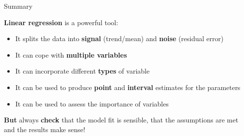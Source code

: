 \documentclass[pdf,handout]{beamer}
\begin{document}
\begin{frame}{Summary}

\textbf{Linear regression} is a powerful tool:

\begin{itemize}

\item It splits the data into \textbf{signal} (trend/mean) and \textbf{noise} (residual error)
\item It can cope with \textbf{multiple variables} 
\item It can incorporate different \textbf{types} of variable
\item It can be used to produce \textbf{point} and \textbf{interval} estimates for the parameters
\item It can be used to assess the importance of variables
\end{itemize}

\textbf{But} always \textbf{check} that the model fit is sensible, that the assumptions are met and the results make sense!

\end{frame}

\end{document}
